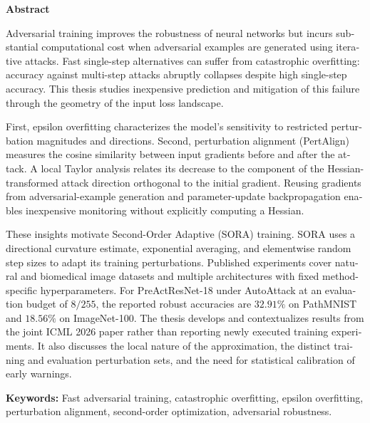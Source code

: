 \begin{latin}
\begin{center}\textbf{Abstract}\end{center}
Adversarial training improves the robustness of neural networks but incurs substantial computational cost when adversarial examples are generated using iterative attacks. Fast single-step alternatives can suffer from catastrophic overfitting: accuracy against multi-step attacks abruptly collapses despite high single-step accuracy. This thesis studies inexpensive prediction and mitigation of this failure through the geometry of the input loss landscape.

First, epsilon overfitting characterizes the model's sensitivity to restricted perturbation magnitudes and directions. Second, perturbation alignment (PertAlign) measures the cosine similarity between input gradients before and after the attack. A local Taylor analysis relates its decrease to the component of the Hessian-transformed attack direction orthogonal to the initial gradient. Reusing gradients from adversarial-example generation and parameter-update backpropagation enables inexpensive monitoring without explicitly computing a Hessian.

These insights motivate Second-Order Adaptive (SORA) training. SORA uses a directional curvature estimate, exponential averaging, and elementwise random step sizes to adapt its training perturbations. Published experiments cover natural and biomedical image datasets and multiple architectures with fixed method-specific hyperparameters. For PreActResNet-18 under AutoAttack at an evaluation budget of $8/255$, the reported robust accuracies are $32.91\%$ on PathMNIST and $18.56\%$ on ImageNet-100. The thesis develops and contextualizes results from the joint ICML 2026 paper rather than reporting newly executed training experiments. It also discusses the local nature of the approximation, the distinct training and evaluation perturbation sets, and the need for statistical calibration of early warnings.

\bigskip\noindent\textbf{Keywords:}
Fast adversarial training, catastrophic overfitting, epsilon overfitting, perturbation alignment, second-order optimization, adversarial robustness.
\end{latin}
